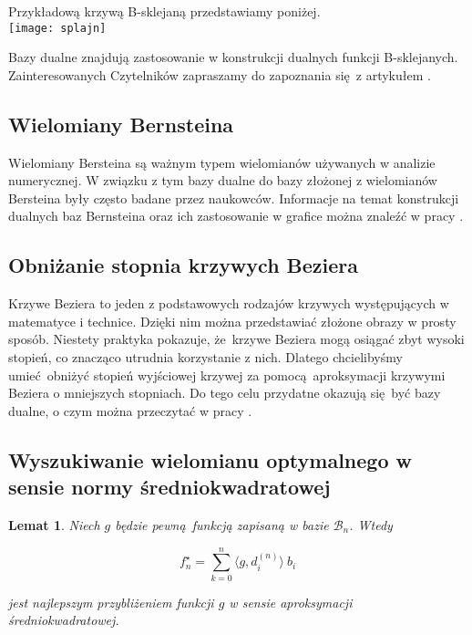 \documentclass{article}
\newtheorem{lemat}{Lemat}
\begin{document}
Przykładową krzywą B-sklejaną przedstawiamy poniżej.\\

\texttt{[image: splajn]}

Bazy dualne znajdują zastosowanie w konstrukcji dualnych funkcji B-sklejanych.\\ Zainteresowanych Czytelników zapraszamy do zapoznania się z artykułem \cite{PWO2}.

\subsection{Wielomiany Bernsteina}

Wielomiany Bersteina są ważnym typem wielomianów używanych w analizie numerycznej. W związku z tym bazy dualne do bazy złożonej z wielomianów Bersteina były często badane przez naukowców. Informacje na temat konstrukcji dualnych baz Bernsteina oraz ich zastosowanie w grafice można znaleźć w pracy \cite{PWOiSLE}.  

\subsection{Obniżanie stopnia krzywych Beziera}

Krzywe Beziera to jeden z podstawowych rodzajów krzywych występujących w matematyce i technice. Dzięki nim można przedstawiać złożone obrazy w prosty sposób. Niestety praktyka pokazuje, że krzywe Beziera mogą osiągać zbyt wysoki stopień, co znacząco utrudnia korzystanie z nich. Dlatego chcielibyśmy umieć obniżyć stopień wyjściowej krzywej za pomocą aproksymacji krzywymi Beziera o mniejszych stopniach. Do tego celu przydatne okazują się być bazy dualne, o czym można przeczytać w pracy \cite{PGOiPWO}. 

\pagebreak

\subsection{Wyszukiwanie wielomianu optymalnego w sensie normy średniokwadratowej}

\begin{lemat}
Niech $g$ będzie pewną funkcją zapisaną w bazie $\mathcal{B}_n$. Wtedy

$$
f_n^{\star} = \sum_{k=0}^n \langle g,  d_i^{(n)} \rangle \ b_i
$$

jest najlepszym przybliżeniem funkcji $g$ w sensie aproksymacji średniokwadratowej.

\end{lemat}
\end{document}

